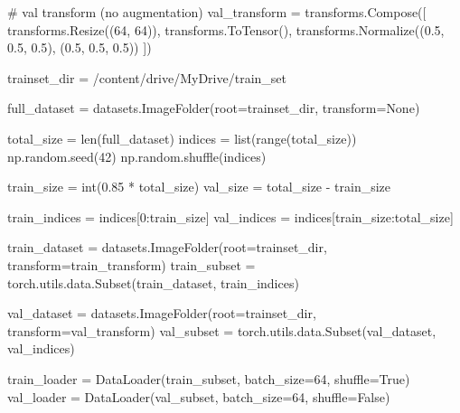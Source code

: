 \documentclass[
  letterpaper,
  DIV=11,
  numbers=noendperiod]{scrartcl}
\newenvironment{Shaded}{\begin{snugshade}}{\end{snugshade}}
\newcommand{\BuiltInTok}[1]{\textcolor[rgb]{0.00,0.23,0.31}{#1}}
\newcommand{\CommentTok}[1]{\textcolor[rgb]{0.37,0.37,0.37}{#1}}
\newcommand{\DecValTok}[1]{\textcolor[rgb]{0.68,0.00,0.00}{#1}}
\newcommand{\FloatTok}[1]{\textcolor[rgb]{0.68,0.00,0.00}{#1}}
\newcommand{\NormalTok}[1]{\textcolor[rgb]{0.00,0.23,0.31}{#1}}
\newcommand{\OperatorTok}[1]{\textcolor[rgb]{0.37,0.37,0.37}{#1}}
\newcommand{\StringTok}[1]{\textcolor[rgb]{0.13,0.47,0.30}{#1}}
\newcommand{\VariableTok}[1]{\textcolor[rgb]{0.07,0.07,0.07}{#1}}
\begin{document}
\begin{Shaded}
\begin{Highlighting}[]
\CommentTok{\# val transform (no augmentation)}
\NormalTok{val\_transform }\OperatorTok{=}\NormalTok{ transforms.Compose([}
\NormalTok{    transforms.Resize((}\DecValTok{64}\NormalTok{, }\DecValTok{64}\NormalTok{)),}
\NormalTok{    transforms.ToTensor(),}
\NormalTok{    transforms.Normalize((}\FloatTok{0.5}\NormalTok{, }\FloatTok{0.5}\NormalTok{, }\FloatTok{0.5}\NormalTok{), (}\FloatTok{0.5}\NormalTok{, }\FloatTok{0.5}\NormalTok{, }\FloatTok{0.5}\NormalTok{))}
\NormalTok{])}

\NormalTok{trainset\_dir }\OperatorTok{=} \StringTok{\textquotesingle{}/content/drive/MyDrive/train\_set\textquotesingle{}}

\NormalTok{full\_dataset }\OperatorTok{=}\NormalTok{ datasets.ImageFolder(root}\OperatorTok{=}\NormalTok{trainset\_dir, transform}\OperatorTok{=}\VariableTok{None}\NormalTok{)}

\NormalTok{total\_size }\OperatorTok{=} \BuiltInTok{len}\NormalTok{(full\_dataset)}
\NormalTok{indices }\OperatorTok{=} \BuiltInTok{list}\NormalTok{(}\BuiltInTok{range}\NormalTok{(total\_size))}
\NormalTok{np.random.seed(}\DecValTok{42}\NormalTok{)}
\NormalTok{np.random.shuffle(indices)}

\NormalTok{train\_size }\OperatorTok{=} \BuiltInTok{int}\NormalTok{(}\FloatTok{0.85} \OperatorTok{*}\NormalTok{ total\_size)}
\NormalTok{val\_size }\OperatorTok{=}\NormalTok{ total\_size }\OperatorTok{{-}}\NormalTok{ train\_size}

\NormalTok{train\_indices }\OperatorTok{=}\NormalTok{ indices[}\DecValTok{0}\NormalTok{:train\_size]}
\NormalTok{val\_indices }\OperatorTok{=}\NormalTok{ indices[train\_size:total\_size]}

\NormalTok{train\_dataset }\OperatorTok{=}\NormalTok{ datasets.ImageFolder(root}\OperatorTok{=}\NormalTok{trainset\_dir, transform}\OperatorTok{=}\NormalTok{train\_transform)}
\NormalTok{train\_subset }\OperatorTok{=}\NormalTok{ torch.utils.data.Subset(train\_dataset, train\_indices)}

\NormalTok{val\_dataset }\OperatorTok{=}\NormalTok{ datasets.ImageFolder(root}\OperatorTok{=}\NormalTok{trainset\_dir, transform}\OperatorTok{=}\NormalTok{val\_transform)}
\NormalTok{val\_subset }\OperatorTok{=}\NormalTok{ torch.utils.data.Subset(val\_dataset, val\_indices)}

\NormalTok{train\_loader }\OperatorTok{=}\NormalTok{ DataLoader(train\_subset, batch\_size}\OperatorTok{=}\DecValTok{64}\NormalTok{, shuffle}\OperatorTok{=}\VariableTok{True}\NormalTok{)}
\NormalTok{val\_loader }\OperatorTok{=}\NormalTok{ DataLoader(val\_subset, batch\_size}\OperatorTok{=}\DecValTok{64}\NormalTok{, shuffle}\OperatorTok{=}\VariableTok{False}\NormalTok{)}



\end{Highlighting}
\end{Shaded}
\end{document}
